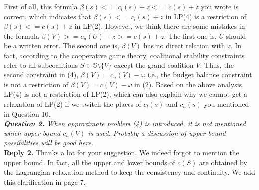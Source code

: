 \documentclass[11pt]{article}
\begin{document}
First of all, this formula $\beta(s) <= c_l(s) + z <= c(s) + z$ you wrote is correct, which indicates that $\beta(s) <= c_l(s) + z$ in LP(4) is a restriction of $\beta(s) <= c(s) + z$ in LP(2).
However, we think there are some mistakes in the formula $\beta(V) >= c_u(U) + z >= c(s) + z$. The first one is, $U$ should be a written error. The second one is, $\beta(V)$ has no direct relation with $z$.
In fact, according to the cooperative game theory, coalitional stability constraints refer to all subcoalitions $S \in \mathbb{S} \setminus \big\{V\big\}$ except the grand coalition $V$.
Thus, the second constraint in (4), $\beta(V)=c_u(V)-\omega$ i.e., the budget balance constraint is not a restriction of $\beta(V)=c(V)-\omega$ in (2).
Based on the above analysis, LP(4) is not a restriction of LP(2), which can also explain why we cannot get a relaxation of LP(2) if we switch the places of $c_l(s)$ and $c_u(s)$ you mentioned in Question 10.
\\[4mm]
%
%
%
\noindent \textit{\textbf{Question 2.}
When approximate problem (4) is introduced, it is not mentioned which upper bound $c_u(V)$ is used. Probably a discussion of upper bound possibilities will be good here.}
\\[2mm]
\noindent \textbf{Reply 2.}
Thanks a lot for your suggestion. We indeed forgot to mention the upper bound. In fact, all the upper and lower bounds of $c(S)$ are obtained by the Lagrangian relaxation method to keep the consistency and continuity. We add this clarification in page 7.


\end{document}
